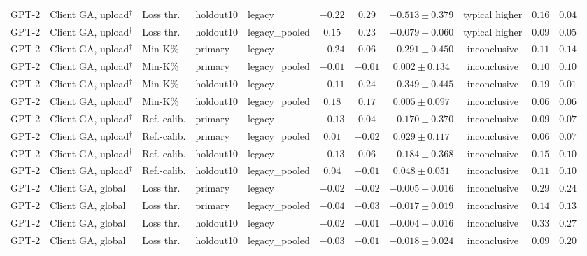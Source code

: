 \begin{table}[t]
\begin{tabular*}{\textwidth}{@{\extracolsep{\fill}}lllllcccccc@{}}
GPT-2 & Client GA, upload$^{\dagger}$ & Loss thr. & holdout10 & legacy & $-0.22$ & $0.29$ & $-0.513 \pm 0.379$ & typical higher & $0.16$ & $0.04$ \\
GPT-2 & Client GA, upload$^{\dagger}$ & Loss thr. & holdout10 & legacy\_pooled & $0.15$ & $0.23$ & $-0.079 \pm 0.060$ & typical higher & $0.09$ & $0.05$ \\
GPT-2 & Client GA, upload$^{\dagger}$ & Min-K\% & primary & legacy & $-0.24$ & $0.06$ & $-0.291 \pm 0.450$ & inconclusive & $0.11$ & $0.14$ \\
GPT-2 & Client GA, upload$^{\dagger}$ & Min-K\% & primary & legacy\_pooled & $-0.01$ & $-0.01$ & $0.002 \pm 0.134$ & inconclusive & $0.10$ & $0.10$ \\
GPT-2 & Client GA, upload$^{\dagger}$ & Min-K\% & holdout10 & legacy & $-0.11$ & $0.24$ & $-0.349 \pm 0.445$ & inconclusive & $0.19$ & $0.01$ \\
GPT-2 & Client GA, upload$^{\dagger}$ & Min-K\% & holdout10 & legacy\_pooled & $0.18$ & $0.17$ & $0.005 \pm 0.097$ & inconclusive & $0.06$ & $0.06$ \\
GPT-2 & Client GA, upload$^{\dagger}$ & Ref.-calib. & primary & legacy & $-0.13$ & $0.04$ & $-0.170 \pm 0.370$ & inconclusive & $0.09$ & $0.07$ \\
GPT-2 & Client GA, upload$^{\dagger}$ & Ref.-calib. & primary & legacy\_pooled & $0.01$ & $-0.02$ & $0.029 \pm 0.117$ & inconclusive & $0.06$ & $0.07$ \\
GPT-2 & Client GA, upload$^{\dagger}$ & Ref.-calib. & holdout10 & legacy & $-0.13$ & $0.06$ & $-0.184 \pm 0.368$ & inconclusive & $0.15$ & $0.10$ \\
GPT-2 & Client GA, upload$^{\dagger}$ & Ref.-calib. & holdout10 & legacy\_pooled & $0.04$ & $-0.01$ & $0.048 \pm 0.051$ & inconclusive & $0.11$ & $0.10$ \\
GPT-2 & Client GA, global & Loss thr. & primary & legacy & $-0.02$ & $-0.02$ & $-0.005 \pm 0.016$ & inconclusive & $0.29$ & $0.24$ \\
GPT-2 & Client GA, global & Loss thr. & primary & legacy\_pooled & $-0.04$ & $-0.03$ & $-0.017 \pm 0.019$ & inconclusive & $0.14$ & $0.13$ \\
GPT-2 & Client GA, global & Loss thr. & holdout10 & legacy & $-0.02$ & $-0.01$ & $-0.004 \pm 0.016$ & inconclusive & $0.33$ & $0.27$ \\
GPT-2 & Client GA, global & Loss thr. & holdout10 & legacy\_pooled & $-0.03$ & $-0.01$ & $-0.018 \pm 0.024$ & inconclusive & $0.09$ & $0.20$ \\

\end{tabular*}
\end{table}
